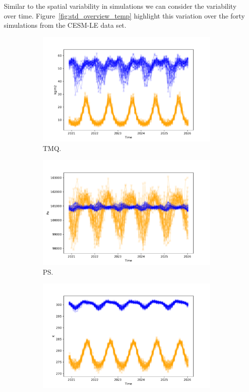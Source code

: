 Similar to the spatial variability in simulations we can consider the variability over time.
Figure~\ref{fig:std_overview_temp} highlight this variation over the forty simulations from the CESM-LE data set. 

\begin{figure}[htbp!] 
	\centering
	\begin{subfigure}[b]{0.45\textwidth}
		\includegraphics[width=\textwidth]{TMQ_std_temp}
		\caption{TMQ.}
		\label{fig:std_precip_temp}   
	\end{subfigure}             
	\begin{subfigure}[b]{0.45\textwidth}
		\includegraphics[width=\textwidth]{PS_std_temp}
		\caption{PS.}
		\label{fig:std_pressure_temp}
	\end{subfigure}             
	\hfill
	\begin{subfigure}[b]{0.45\textwidth}
		\includegraphics[width=\textwidth]{TREFHT_std_temp}

\end{subfigure}
\end{figure}

